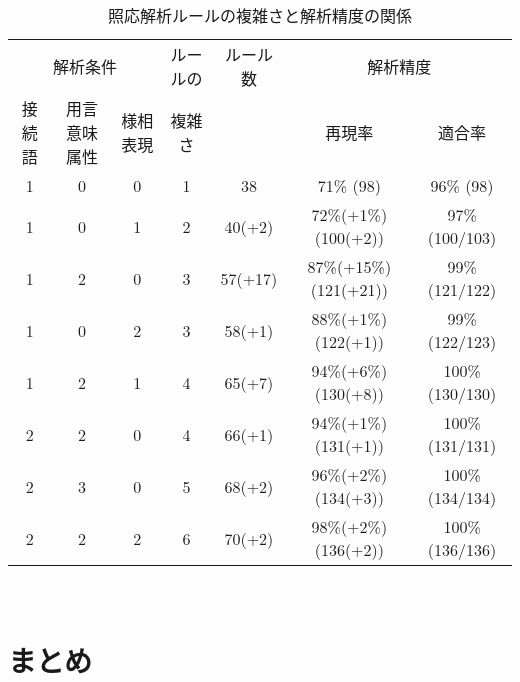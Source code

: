 \begin{table}[htbp]
  \begin{center}
  \caption{照応解析ルールの複雑さと解析精度の関係}
    \hspace{2mm}
    \footnotesize
    \begin{tabular}{||c|c|c|c|c||c|c||} \hline \hline
      \multicolumn{3}{||c|}{解析条件} & ルールの & ルール数 & \multicolumn{2}{c||}{解析精度}\\ \cline{1-3}\cline{6-7}
      接続語 & 用言意味属性 & 様相表現 & 複雑さ & & 再現率 & 適合率\\ \hline \hline
      1 & 0 & 0 & 1 & 38 & 71\% (98) & 96\% (98) \\ \hline
      1 & 0 & 1 & 2 & 40(+2) & 72\%(+1\%) (100(+2)) & 97\% (100/103) \\ \hline
      1 & 2 & 0 & 3 & 57(+17) & 87\%(+15\%) (121(+21)) & 99\% (121/122) \\ \hline
      1 & 0 & 2 & 3 & 58(+1)  & 88\%(+1\%) (122(+1)) & 99\% (122/123) \\ \hline
      1 & 2 & 1 & 4 & 65(+7)  & 94\%(+6\%) (130(+8)) & 100\% (130/130) \\ \hline
      2 & 2 & 0 & 4 & 66(+1)  & 94\%(+1\%) (131(+1)) & 100\% (131/131) \\ \hline
      2 & 3 & 0 & 5 & 68(+2)  & 96\%(+2\%) (134(+3)) & 100\% (134/134) \\ \hline
      2 & 2 & 2 & 6 & 70(+2)  & 98\%(+2\%) (136(+2)) & 100\% (136/136) \\ \hline \hline
    \end{tabular} \\
  \end{center}
  \label{tab:eval-comp}
\end{table}

\section{まとめ}

